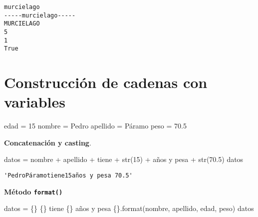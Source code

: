 \documentclass[
  letterpaper,
  DIV=11,
  numbers=noendperiod]{scrreprt}
\newenvironment{Shaded}{\begin{snugshade}}{\end{snugshade}}
\newcommand{\BuiltInTok}[1]{\textcolor[rgb]{0.00,0.23,0.31}{#1}}
\newcommand{\DecValTok}[1]{\textcolor[rgb]{0.68,0.00,0.00}{#1}}
\newcommand{\FloatTok}[1]{\textcolor[rgb]{0.68,0.00,0.00}{#1}}
\newcommand{\NormalTok}[1]{\textcolor[rgb]{0.00,0.23,0.31}{#1}}
\newcommand{\OperatorTok}[1]{\textcolor[rgb]{0.37,0.37,0.37}{#1}}
\newcommand{\SpecialCharTok}[1]{\textcolor[rgb]{0.37,0.37,0.37}{#1}}
\newcommand{\StringTok}[1]{\textcolor[rgb]{0.13,0.47,0.30}{#1}}
\begin{document}
\begin{verbatim}
murcielago
-----murcielago-----
MURCIELAGO
5
1
True
\end{verbatim}

\section{Construcción de cadenas con
variables}\label{construcciuxf3n-de-cadenas-con-variables}

\begin{Shaded}
\begin{Highlighting}[]
\NormalTok{edad }\OperatorTok{=} \DecValTok{15}
\NormalTok{nombre }\OperatorTok{=} \StringTok{\textquotesingle{}Pedro\textquotesingle{}}
\NormalTok{apellido }\OperatorTok{=} \StringTok{\textquotesingle{}Páramo\textquotesingle{}}
\NormalTok{peso }\OperatorTok{=} \FloatTok{70.5}
\end{Highlighting}
\end{Shaded}

\textbf{Concatenación y casting}.

\begin{Shaded}
\begin{Highlighting}[]
\NormalTok{datos }\OperatorTok{=}\NormalTok{ nombre }\OperatorTok{+}\NormalTok{ apellido }\OperatorTok{+} \StringTok{\textquotesingle{}tiene\textquotesingle{}} \OperatorTok{+} \BuiltInTok{str}\NormalTok{(}\DecValTok{15}\NormalTok{) }\OperatorTok{+} \StringTok{\textquotesingle{}años y pesa \textquotesingle{}} \OperatorTok{+} \BuiltInTok{str}\NormalTok{(}\FloatTok{70.5}\NormalTok{)}
\NormalTok{datos}
\end{Highlighting}
\end{Shaded}

\begin{verbatim}
'PedroPáramotiene15años y pesa 70.5'
\end{verbatim}

\textbf{Método \texttt{format()}}

\begin{Shaded}
\begin{Highlighting}[]
\NormalTok{datos }\OperatorTok{=} \StringTok{\textquotesingle{}}\SpecialCharTok{\{\}}\StringTok{ }\SpecialCharTok{\{\}}\StringTok{ tiene }\SpecialCharTok{\{\}}\StringTok{ años y pesa }\SpecialCharTok{\{\}}\StringTok{\textquotesingle{}}\NormalTok{.}\BuiltInTok{format}\NormalTok{(nombre, apellido, edad, peso)}
\NormalTok{datos}
\end{Highlighting}
\end{Shaded}
\end{document}
